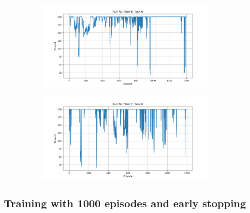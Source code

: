 \documentclass[runningheads]{llncs}
\begin{document}
\begin{figure}[H]
\begin{subfigure}{.45\textwidth}
     \end{subfigure}
      \begin{subfigure}{.45\textwidth}
          \centering
          \includegraphics[width=1\textwidth] {imgs/5000_episodes/Task_6_run_6}
      \end{subfigure}
      \begin{subfigure}{.45\textwidth}
          \centering
          \includegraphics[width=1\textwidth] {imgs/5000_episodes/Task_6_run_7}
      \end{subfigure}
 \end{figure}

\newpage

\subsection{Training with 1000 episodes and early stopping}
\end{document}
